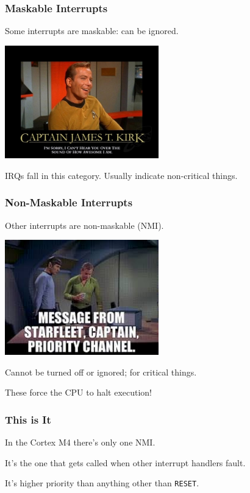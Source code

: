 \begin{frame}
\frametitle{Maskable Interrupts}

Some interrupts are \alert{maskable}: can be ignored.

\begin{center}
	\includegraphics[width=0.5\textwidth]{images/awesome.jpg}
\end{center}

IRQs fall in this category. Usually indicate non-critical things.

\end{frame}

\begin{frame}
\frametitle{Non-Maskable Interrupts}

Other interrupts are non-maskable (NMI).

\begin{center}
	\includegraphics[width=0.5\textwidth]{images/prioritychannel.jpg}
\end{center}

Cannot be turned off or ignored; for critical things.

These force the CPU to halt execution!

\end{frame}

\begin{frame}
\frametitle{This is It}

In the Cortex M4 there's only one NMI.

It's the one that gets called when other interrupt handlers fault.

It's higher priority than anything other than \texttt{RESET}.

\end{frame}

